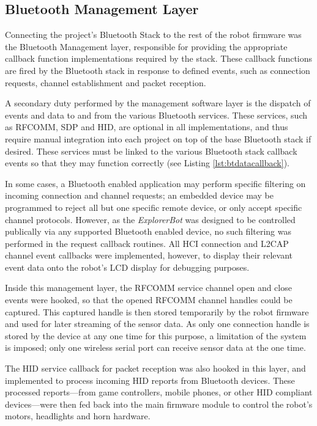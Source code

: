 \FloatBarrier
\subsection{Bluetooth Management Layer}

Connecting the project's Bluetooth Stack to the rest of the robot firmware was the Bluetooth Management layer, responsible for providing the appropriate callback function implementations required by the stack. These callback functions are fired by the Bluetooth stack in response to defined events, such as connection requests, channel establishment and packet reception.

A secondary duty performed by the management software layer is the dispatch of events and data to and from the various Bluetooth services. These services, such as RFCOMM, SDP and HID, are optional in all implementations, and thus require manual integration into each project on top of the base Bluetooth stack if desired. These services must be linked to the various Bluetooth stack callback events so that they may function correctly (see Listing \ref{lst:btdatacallback}).



In some cases, a Bluetooth enabled application may perform specific filtering on incoming connection and channel requests; an embedded device may be programmed to reject all but one specific remote device, or only accept specific channel protocols. However, as the \textit{ExplorerBot} was designed to be controlled publically via any supported Bluetooth enabled device, no such filtering was performed in the request callback routines. All HCI connection and L2CAP channel event callbacks were implemented, however, to display their relevant event data onto the robot's LCD display for debugging purposes.

Inside this management layer, the RFCOMM service channel open and close events were hooked, so that the opened RFCOMM channel handles could be captured. This captured handle is then stored temporarily by the robot firmware and used for later streaming of the sensor data. As only one connection handle is stored by the device at any one time for this purpose, a limitation of the system is imposed; only one wireless serial port can receive sensor data at the one time.

The HID service callback for packet reception was also hooked in this layer, and implemented to process incoming HID reports from Bluetooth devices. These processed reports---from game controllers, mobile phones, or other HID compliant devices---were then fed back into the main firmware module to control the robot's motors, headlights and horn hardware.